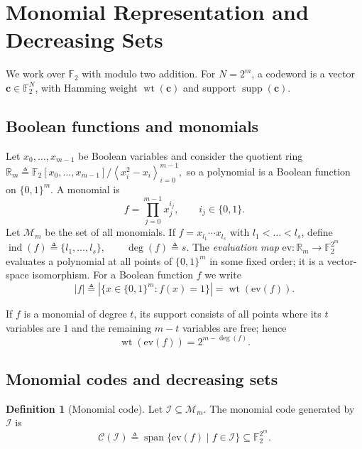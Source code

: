 \documentclass[conference]{IEEEtran}
\theoremstyle{definition}
\newtheorem{definition}{Definition}
\DeclareMathOperator{\supp}{supp}
\newcommand{\wt}{\operatorname{wt}}
\newcommand{\I}{\mathcal{I}}
\newcommand{\C}{\mathcal{C}}
\newcommand{\ind}{\operatorname{ind}}
\newcommand{\ft}{\mathbb{F}_2}
\newcommand{\Mon}{\mathcal{M}_{m}}
\begin{document}

\section{Monomial Representation and Decreasing Sets}
\label{sec:prelim}

We work over $\ft$ with modulo two addition. For $N=2^m$, a codeword is a vector $\bm c\in\ft^N$, with Hamming weight $\wt(\bm c)$ and support $\supp(\bm c)$.

\subsection{Boolean functions and monomials}

Let $x_0,\dots,x_{m-1}$ be Boolean variables and consider the quotient ring $\mathbb{R}_m \triangleq \ft[x_0,\dots,x_{m-1}]/\left\langle x_i^2-x_i\right\rangle_{i=0}^{m-1},$ so a polynomial is a Boolean function on $\{0,1\}^m$. A monomial is
\[
f = \prod_{j=0}^{m-1} x_j^{i_j},\qquad i_j\in\{0,1\}.
\]
Let $\Mon$ be the set of all monomials. If $f = x_{l_1}\cdots x_{l_s}$ with $l_1<\dots<l_s$, define 
$\ind(f) \triangleq \{l_1,\dots,l_s\},\qquad
\deg(f)\triangleq s$. 
The \emph{evaluation map} $\mathrm{ev}:\mathbb{R}_m\to\ft^{2^m}$ evaluates a polynomial at all points of $\{0,1\}^m$ in some fixed order; it is a vector-space isomorphism. For a Boolean function $f$ we write
\[
|f| \triangleq |\{x\in\{0,1\}^m : f(x)=1\}| = \wt(\mathrm{ev}(f)).
\]

If $f$ is a monomial of degree $t$, its support consists of all points where its $t$ variables are $1$ and the remaining $m-t$ variables are free; hence
\begin{equation}
\wt(\mathrm{ev}(f)) = 2^{m-\deg(f)}.
\label{eq:monom-weight}
\end{equation}

\subsection{Monomial codes and decreasing sets}

\begin{definition}[Monomial code]
Let $\I\subseteq\Mon$. The monomial code generated by $\I$ is
\[
\C(\I)\triangleq\operatorname{span}\{\mathrm{ev}(f)\mid f\in\I\}\subseteq\ft^{2^m}.
\]
\end{definition}
\end{document}
